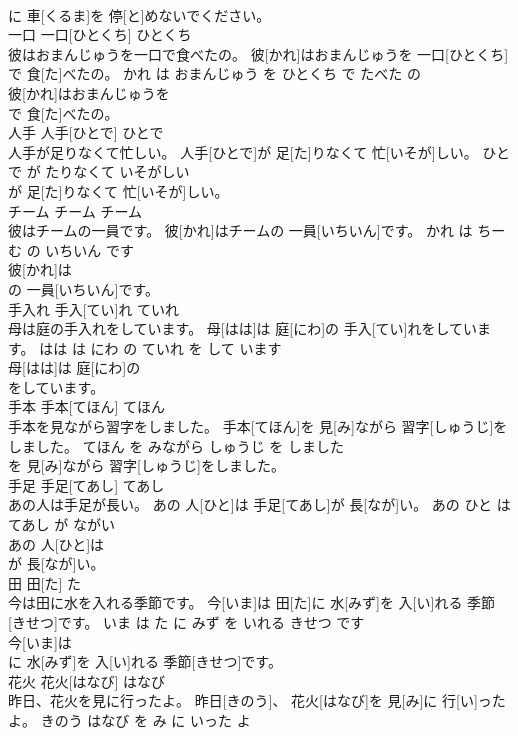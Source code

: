 \documentclass[8pt]{extreport}
\begin{document}
\begin{CJK}{UTF8}{min}
\\	に 車[くるま]を 停[と]めないでください。			
\\	一口	一口[ひとくち]	ひとくち	
\\	彼はおまんじゅうを一口で食べたの。	彼[かれ]はおまんじゅうを 一口[ひとくち]で 食[た]べたの。	かれ は おまんじゅう を ひとくち で たべた の	
\\	彼[かれ]はおまんじゅうを
\\	で 食[た]べたの。			
\\	人手	人手[ひとで]	ひとで	
\\	人手が足りなくて忙しい。	人手[ひとで]が 足[た]りなくて 忙[いそが]しい。	ひとで が たりなくて いそがしい	
\\	が 足[た]りなくて 忙[いそが]しい。			
\\	チーム	チーム	チーム	
\\	彼はチームの一員です。	彼[かれ]はチームの 一員[いちいん]です。	かれ は ちーむ の いちいん です	
\\	彼[かれ]は
\\	の 一員[いちいん]です。			
\\	手入れ	手入[てい]れ	ていれ	
\\	母は庭の手入れをしています。	母[はは]は 庭[にわ]の 手入[てい]れをしています。	はは は にわ の ていれ を して います	
\\	母[はは]は 庭[にわ]の
\\	をしています。			
\\	手本	手本[てほん]	てほん	
\\	手本を見ながら習字をしました。	手本[てほん]を 見[み]ながら 習字[しゅうじ]をしました。	てほん を みながら しゅうじ を しました	
\\	を 見[み]ながら 習字[しゅうじ]をしました。			
\\	手足	手足[てあし]	てあし	
\\	あの人は手足が長い。	あの 人[ひと]は 手足[てあし]が 長[なが]い。	あの ひと は てあし が ながい	
\\	あの 人[ひと]は
\\	が 長[なが]い。			
\\	田	田[た]	た	
\\	今は田に水を入れる季節です。	今[いま]は 田[た]に 水[みず]を 入[い]れる 季節[きせつ]です。	いま は た に みず を いれる きせつ です	
\\	今[いま]は
\\	に 水[みず]を 入[い]れる 季節[きせつ]です。			
\\	花火	花火[はなび]	はなび	
\\	昨日、花火を見に行ったよ。	昨日[きのう]、 花火[はなび]を 見[み]に 行[い]ったよ。	きのう はなび を み に いった よ	

\end{CJK}
\end{document}
